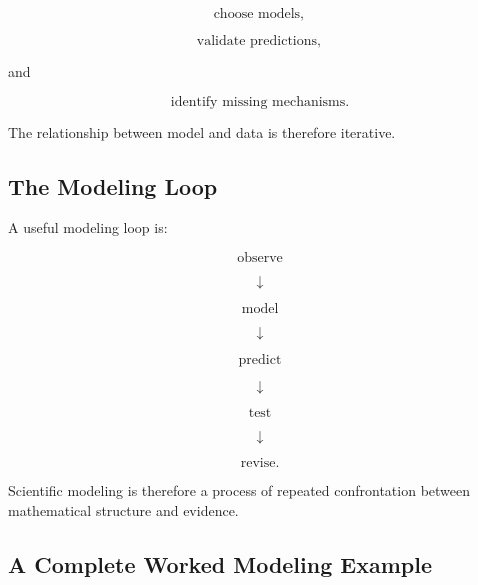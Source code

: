 \[
\boxed{
\text{choose models},
}
\]

\[
\boxed{
\text{validate predictions},
}
\]

and

\[
\boxed{
\text{identify missing mechanisms}.
}
\]

The relationship between model and data is therefore iterative.

\subsection{The Modeling Loop}
\label{subsec:modeling-loop}

A useful modeling loop is:

\[
\boxed{
\text{observe}
}
\]

\[
\downarrow
\]

\[
\boxed{
\text{model}
}
\]

\[
\downarrow
\]

\[
\boxed{
\text{predict}
}
\]

\[
\downarrow
\]

\[
\boxed{
\text{test}
}
\]

\[
\downarrow
\]

\[
\boxed{
\text{revise}.
}
\]

Scientific modeling is therefore a process of repeated confrontation between
mathematical structure and evidence.

\subsection{A Complete Worked Modeling Example}
\label{subsec:complete-worked-modeling-example}

